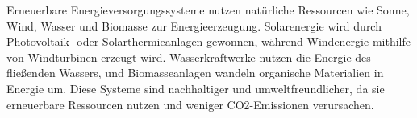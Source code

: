 Erneuerbare Energieversorgungssysteme nutzen natürliche Ressourcen wie Sonne,
Wind, Wasser und Biomasse zur Energieerzeugung. Solarenergie wird durch
Photovoltaik- oder Solarthermieanlagen gewonnen, während Windenergie mithilfe
von Windturbinen erzeugt wird. Wasserkraftwerke nutzen die Energie des
fließenden Wassers, und Biomasseanlagen wandeln organische Materialien in
Energie um. Diese Systeme sind nachhaltiger und umweltfreundlicher, da sie
erneuerbare Ressourcen nutzen und weniger CO2-Emissionen verursachen.